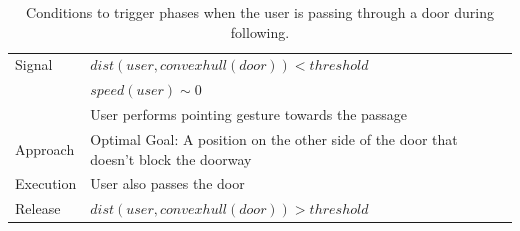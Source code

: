 \begin{table}[H]
	\centering
  \begin{tabular}{l |  m{10cm}}    
    \toprule    
    Signal & {$dist(user, convexhull(door))<threshold$}\\         
    	      & {$speed(user)\sim 0$} \\
	      & {User performs pointing gesture towards the passage}\\ \midrule	                           
    Approach & {Optimal Goal: A position on the other side of the door that doesn't block the doorway}\\       \midrule
    Execution & {User also passes the door}\\  \midrule
    Release & {$dist(user, convexhull(door))>threshold$ }\\ 
    \bottomrule
  \end{tabular}
      \caption{Conditions to trigger phases when the user is passing through a door during following.}
    \label{table:situation_aware_list_group}
\end{table}

